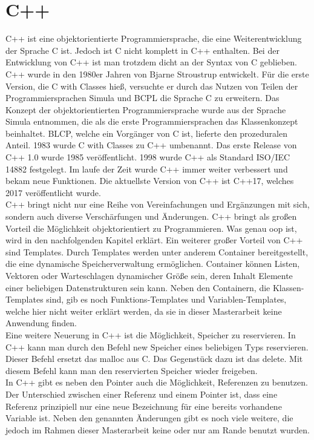 \section{C++ }
C++ ist eine objektorientierte Programmiersprache, die eine Weiterentwicklung der Sprache C ist. Jedoch ist C nicht komplett in C++ enthalten. Bei der Entwicklung von C++ ist man trotzdem dicht an der Syntax von C geblieben. C++ wurde in den 1980er Jahren von Bjarne Stroustrup entwickelt. Für die erste Version, die \glqq C with Classes\grqq{} hieß, versuchte er durch das Nutzen von Teilen der Programmiersprachen Simula und BCPL die Sprache C zu erweitern. Das Konzept der objektorientierten Programmiersprache  wurde aus der Sprache Simula entnommen, die als die erste Programmiersprachen das Klassenkonzept beinhaltet.  BLCP, welche ein Vorgänger von C ist, lieferte den  prozeduralen Anteil.   1983 wurde \glqq C with Classes\grqq{} zu C++ umbenannt. Das erste Release von C++ 1.0 wurde 1985 veröffentlicht. 1998 wurde C++ als Standard \glqq ISO/IEC 14882\grqq{} festgelegt. Im laufe der Zeit wurde C++ immer weiter verbessert und bekam neue Funktionen. Die aktuellste Version von C++ ist C++17, welches 2017 veröffentlicht wurde.\\
C++ bringt nicht nur eine Reihe von Vereinfachungen und Ergänzungen mit sich, sondern auch diverse Verschärfungen und Änderungen. 
C++ bringt als großen Vorteil die Möglichkeit objektorientiert zu Programmieren. Was genau  \acl{oop} ist, wird in den nachfolgenden Kapitel erklärt. Ein weiterer großer Vorteil von C++ sind Templates. Durch Templates werden unter anderem Container bereitgestellt, die eine dynamische Speicherverwaltung ermöglichen. Container können Listen, Vektoren oder Warteschlagen dynamischer Größe sein, deren Inhalt Elemente einer beliebigen Datenstrukturen sein kann. Neben den Containern, die Klassen-Templates  sind,  gib es noch Funktions-Templates und Variablen-Templates, welche hier nicht weiter erklärt werden, da sie in dieser Masterarbeit keine Anwendung finden. \\
Eine weitere Neuerung in C++ ist die Möglichkeit, Speicher zu reservieren. In C++ kann man durch den Befehl \glqq new\grqq{} Speicher eines beliebigen Typs reservieren. Dieser Befehl ersetzt das \glqq malloc\grqq{} aus C.  Das Gegenstück dazu ist das  \glqq delete\grqq{}. Mit diesem Befehl kann man den reservierten Speicher wieder freigeben.  \\
In C++ gibt es neben den Pointer auch die Möglichkeit, Referenzen zu benutzen. Der Unterschied zwischen einer Referenz und einem Pointer ist, dass eine Referenz prinzipiell nur eine neue Bezeichnung für eine bereits vorhandene Variable ist.  Neben den genannten Änderungen gibt es noch viele weitere, die jedoch im Rahmen dieser Masterarbeit keine oder nur am Rande benutzt wurden.   
\\
\cite{SebastianMeyer.}
\cite{Krau.}
\cite{Prof.Dr.Ing.WolfgangSchroderPreikschat.}
\cite{HelmutErlenkotter.}
